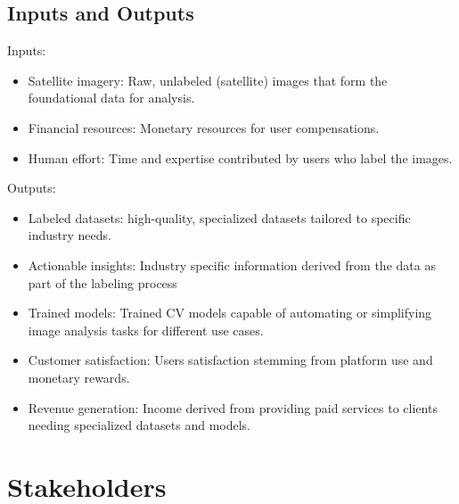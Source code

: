 \documentclass{article}
\begin{document}
\newpage{}
\subsection{Inputs and Outputs}

Inputs:

\begin{itemize}
    \item Satellite imagery: Raw, unlabeled (satellite) images that form the foundational data for analysis.
    \item Financial resources: Monetary resources for user compensations.
    \item Human effort: Time and expertise contributed by users who label the images.
\end{itemize}

Outputs:

\begin{itemize}
    \item Labeled datasets: high-quality, specialized datasets tailored to specific industry needs.
    \item Actionable insights: Industry specific information derived from the data as part of the labeling process
    \item Trained models: Trained CV models capable of automating or simplifying image analysis tasks for different use cases.
    \item Customer satisfaction: Users satisfaction stemming from platform use and monetary rewards.
    \item Revenue generation: Income derived from providing paid services to clients needing specialized datasets and models.
\end{itemize}
\section{Stakeholders}
\end{document}
